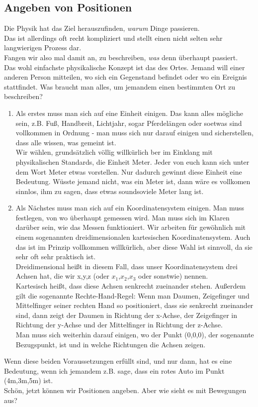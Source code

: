 \documentclass[a4paper, twocolumn, 9pt]{article}
\begin{document}
\begin{footnotesize}
\section*{Angeben von Positionen}
Die Physik hat das Ziel herauszufinden, {\it warum} Dinge passieren.\\ Das ist allerdings oft recht kompliziert und stellt einen nicht selten sehr langwierigen Prozess dar. \\
Fangen wir also mal damit an, zu beschreiben, {\it was} denn überhaupt passiert.\\
Das wohl einfachste physikalische Konzept ist das des Ortes. Jemand will einer anderen Person mitteilen, wo sich ein Gegenstand befindet oder wo ein Ereignis stattfindet. Was braucht man alles, um jemandem einen bestimmten Ort zu beschreiben?
\begin{enumerate}
    \item Als erstes muss man sich auf eine Einheit einigen. Das kann alles mögliche sein, z.B. Fuß, Handbreit, Lichtjahr, sogar Pferdelängen oder soetwas sind vollkommen in Ordnung - man muss sich nur darauf einigen und sicherstellen, dass alle wissen, was gemeint ist. \\Wir wählen, grundsätzlich völlig willkürlich ber im Einklang mit physikalischen Standards, die Einheit Meter. Jeder von euch kann sich unter dem Wort Meter etwas vorstellen. Nur dadurch gewinnt diese Einheit eine Bedeutung. Wüsste jemand nicht, was ein Meter ist, dann wäre es vollkomen sinnlos, ihm zu sagen, dass etwas soundsoviele Meter lang ist.
    \item Als Nächstes muss man sich auf ein Koordinatensystem einigen. Man muss festlegen, von wo überhaupt gemessen wird. Man muss sich im Klaren darüber sein, wie das Messen funktioniert. Wir arbeiten für gewöhnlich mit einem sogenannten dreidimensionalen kartesischen Koordinatensystem. Auch das ist im Prinzip vollkommen willkürlich, aber diese Wahl ist sinnvoll, da sie sehr oft sehr praktisch ist. \\
    Dreidimensional heißt in diesem Fall, dass unser Koordinatensystem drei Achsen hat, die wir x,y,z (oder $x_1$,$x_2$,$x_3$ oder sonstwie) nennen.\\
    Kartesisch heißt, dass diese Achsen senkrecht zueinander stehen. Außerdem gilt die sogenannte Rechte-Hand-Regel: Wenn man Daumen, Zeigefinger und Mittelfinger seiner rechten Hand so positioniert, dass sie senkrecht zueinander sind, dann zeigt der Daumen in Richtung der x-Achse, der Zeigefinger in Richtung der y-Achse und der Mittelfinger in Richtung der z-Achse.\\
    Man muss sich weiterhin darauf einigen, wo der Punkt (0,0,0), der sogenannte Bezugspunkt, ist und in welche Richtungen die Achsen zeigen. 
\end{enumerate}
Wenn diese beiden Voraussetzungen erfüllt sind, und nur dann, hat es eine Bedeutung, wenn ich jemandem z.B. sage, dass ein rotes Auto im Punkt (4m,3m,5m) ist.\\
Schön, jetzt können wir Positionen angeben. Aber wie sieht es mit Bewegungen aus?\\

\end{footnotesize}
\end{document}
